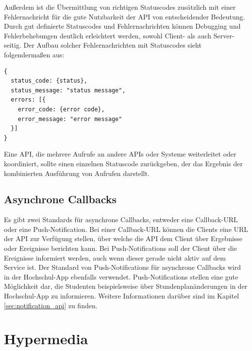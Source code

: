 Außerdem ist die Übermittlung von richtigen Statuscodes zusätzlich mit einer Fehlernachricht für die gute Nutzbarkeit der \ac{API} von entscheidender Bedeutung. Durch gut definierte Statuscodes und Fehlernachrichten können Debugging und Fehlerbehebungen deutlich erleichtert werden, sowohl Client- als auch Server-seitig. Der Aufbau solcher Fehlernachrichten mit Statuscodes sieht folgendermaßen aus:

\begin{lstlisting}[caption={Aufbau Fehlernachricht}]
{
  status_code: {status},
  status_message: "status message",
  errors: [{
    error_code: {error code},
    error_message: "error message"
  }]
}
\end{lstlisting}

Eine \ac{API}, die mehrere Aufrufe an andere \acp{API} oder Systeme weiterleitet oder koordiniert, sollte einen einzelnen Statuscode zurückgeben, der das Ergebnis der kombinierten Ausführung von Aufrufen darstellt.

\subsection{Asynchrone Callbacks}

Es gibt zwei Standards für asynchrone Callbacks, entweder eine Callback-\ac{URL} oder eine Push-Notification. Bei einer Callback-\ac{URL} können die Clients eine \ac{URL} der \ac{API} zur Verfügung stellen, über welche die \ac{API} dem Client über Ergebnisse oder Ereignisse berichten kann. Bei Push-Notifications soll der Client über die Ereignisse informiert werden, auch wenn dieser gerade nicht aktiv auf dem Service ist. Der Standard von Push-Notifications für asynchrone Callbacks wird in der Hochschul-\ac{App} ebenfalls verwendet. Push-Notifications stellen eine gute Möglichkeit dar, die Studenten beispielsweise über Stundenplanänderungen in der Hoch\-schul-\ac{App} zu informieren. Weitere Informationen darüber sind im Kapitel \ref{sec:notification_api} zu finden.

\section{Hypermedia}

